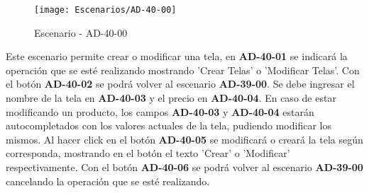 \begin{figure}[H]
\centering
\texttt{[image: Escenarios/AD-40-00]}
\caption{Escenario - AD-40-00}
\label{fig:AD-40-00}
\end{figure}

Este escenario permite crear o modificar una tela, en \textbf{AD-40-01} se indicará la operación que se esté realizando mostrando 'Crear Telas' o 'Modificar Telas'. Con el botón \textbf{AD-40-02} se podrá volver al escenario \textbf{AD-39-00}. Se debe ingresar el nombre de la tela en \textbf{AD-40-03} y el precio en \textbf{AD-40-04}. En caso de estar modificando un producto, los campos \textbf{AD-40-03} y \textbf{AD-40-04} estarán autocompletados con los valores actuales de la tela, pudiendo modificar los mismos. Al hacer click en el botón \textbf{AD-40-05} se modificará o creará la tela según corresponda, mostrando en el botón el texto 'Crear' o 'Modificar' respectivamente. Con el botón \textbf{AD-40-06} se podrá volver al escenario \textbf{AD-39-00} cancelando la operación que se esté realizando.
\\